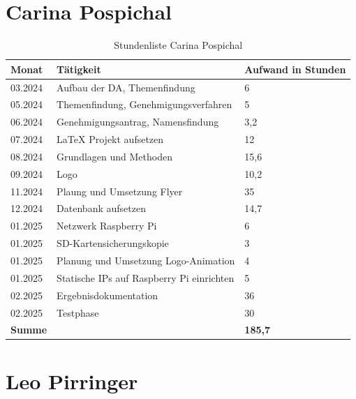 \section*{Carina Pospichal}
\begin{table}[h]
	\begin{tabular}{p{2.5cm} p{10.5cm} p{2.5cm}}
		\hline
		\textbf{Monat} & \textbf{Tätigkeit} & \textbf{Aufwand in Stunden} \\
		\hline
		03.2024 & Aufbau der DA, Themenfindung & 6 \\
		05.2024 & Themenfindung, Genehmigungsverfahren & 5 \\
		06.2024 & Genehmigungsantrag, Namensfindung & 3,2 \\
		07.2024 & LaTeX Projekt aufsetzen& 12 \\
		08.2024 & Grundlagen und Methoden & 15,6 \\
		09.2024 & Logo & 10,2 \\
		11.2024 & Plaung und Umsetzung Flyer & 35 \\
		12.2024 & Datenbank aufsetzen & 14,7 \\
		01.2025 & Netzwerk Raspberry Pi & 6 \\
		01.2025 & SD-Kartensicherungskopie & 3 \\
		01.2025 & Planung und Umsetzung Logo-Animation & 4 \\
		01.2025 & Statische IPs auf Raspberry Pi einrichten & 5 \\
		02.2025 & Ergebnisdokumentation &  36\\
		02.2025 & Testphase & 30 \\
		
		\hline
		\textbf{Summe} & & \textbf{185,7} \\
		\hline
	\end{tabular}
	\caption{Stundenliste Carina Pospichal}
	\label{tab:arbeitsaufwand_Pospichal}
\end{table}

\newpage

\section*{Leo Pirringer}

